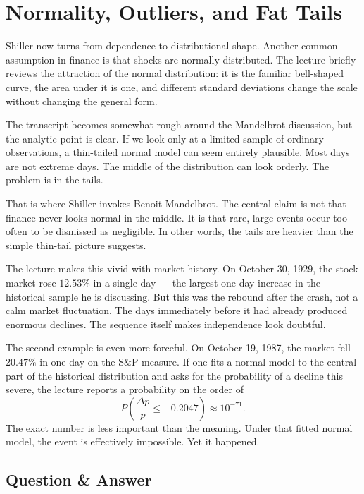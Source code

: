 \section{Normality, Outliers, and Fat Tails}

Shiller now turns from dependence to distributional shape. Another common assumption in finance is that shocks are normally distributed. The lecture briefly reviews the attraction of the normal distribution: it is the familiar bell-shaped curve, the area under it is one, and different standard deviations change the scale without changing the general form.

The transcript becomes somewhat rough around the Mandelbrot discussion, but the analytic point is clear. If we look only at a limited sample of ordinary observations, a thin-tailed normal model can seem entirely plausible. Most days are not extreme days. The middle of the distribution can look orderly. The problem is in the tails.

That is where Shiller invokes Benoit Mandelbrot. The central claim is not that finance never looks normal in the middle. It is that rare, large events occur too often to be dismissed as negligible. In other words, the tails are heavier than the simple thin-tail picture suggests.

The lecture makes this vivid with market history. On October 30, 1929, the stock market rose \(12.53\%\) in a single day --- the largest one-day increase in the historical sample he is discussing. But this was the rebound after the crash, not a calm market fluctuation. The days immediately before it had already produced enormous declines. The sequence itself makes independence look doubtful.

The second example is even more forceful. On October 19, 1987, the market fell \(20.47\%\) in one day on the S\&P measure. If one fits a normal model to the central part of the historical distribution and asks for the probability of a decline this severe, the lecture reports a probability on the order of
\begin{equation}
P\!\left(\frac{\Delta p}{p}\le -0.2047\right)\approx 10^{-71}.
\end{equation}
The exact number is less important than the meaning. Under that fitted normal model, the event is effectively impossible. Yet it happened.

\subsection{Question \& Answer}

